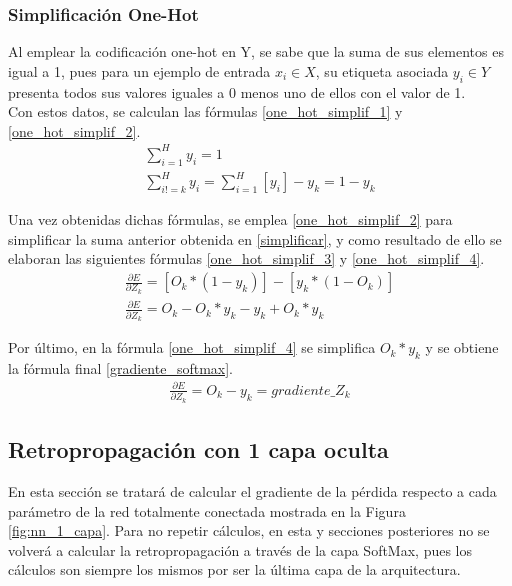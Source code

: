 \subsubsection{Simplificación One-Hot}

Al emplear la codificación one-hot en Y, se sabe que la suma de sus elementos es igual a 1, pues para un ejemplo de entrada $x_i \in X$, su etiqueta asociada $y_i \in Y$ presenta todos sus valores iguales a 0 menos uno de ellos con el valor de 1. \\
Con estos datos, se calculan las fórmulas \ref{one_hot_simplif_1} y \ref{one_hot_simplif_2}.
\begin{gather}
	\sum_{i=1}^{H} y_i = 1 \label{one_hot_simplif_1}\\
	\sum_{i!=k}^{H} y_i = \sum_{i=1}^{H} [y_i] - y_k = 1 - y_k
	\label{one_hot_simplif_2}
\end{gather}

Una vez obtenidas dichas fórmulas, se emplea \ref{one_hot_simplif_2} para simplificar la suma anterior obtenida en \ref{simplificar}, y como resultado de ello se elaboran las siguientes fórmulas \ref{one_hot_simplif_3} y \ref{one_hot_simplif_4}. \\


\begin{gather}
	\frac{\partial E}{\partial Z_k} = [O_k*(1-y_k)] - [y_k*(1-O_k)] \label{one_hot_simplif_3} \\
	\frac{\partial E}{\partial Z_k} = O_k - O_k * y_k - y_k + O_k * y_k  \label{one_hot_simplif_4}
\end{gather}

Por último, en la fórmula \ref{one_hot_simplif_4} se simplifica $O_k*y_k$ y se obtiene la fórmula final \ref{gradiente_softmax}. \\
\begin{gather}
	\frac{\partial E}{\partial Z_k} = O_k - y_k = gradiente\_Z_k
	\label{gradiente_softmax}
\end{gather}

\subsection{Retropropagación con 1 capa oculta \cite{NN_backpropagation} \cite{NN_backprop_2} \label{backprop_1_capa}}

En esta sección se tratará de calcular el gradiente de la pérdida respecto a cada parámetro de la red totalmente conectada mostrada en la Figura \ref{fig:nn_1_capa}. Para no repetir cálculos, en esta y secciones posteriores no se volverá a calcular la retropropagación a través de la capa SoftMax, pues los cálculos son siempre los mismos por ser la última capa de la arquitectura.

